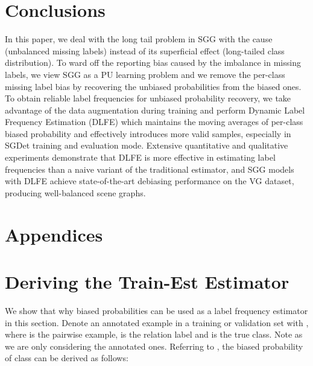 \documentclass[sigconf]{acmart}
\begin{document}
\section{Conclusions}
In this paper, we deal with the long tail problem in SGG with the cause (unbalanced missing labels) instead of its superficial effect (long-tailed class distribution).
To ward off the reporting bias caused by the imbalance in missing labels, we view SGG as a PU learning problem and we remove the per-class missing label bias by recovering the unbiased probabilities from the biased ones.
To obtain reliable label frequencies for unbiased probability recovery, we take advantage of the data augmentation during training and perform Dynamic Label Frequency Estimation (DLFE) which maintains the moving averages of per-class biased probability and effectively introduces more valid samples, especially in SGDet training and evaluation mode.
Extensive quantitative and qualitative experiments demonstrate that DLFE is more effective in estimating label frequencies than a naive variant of the traditional estimator, and SGG models with DLFE achieve state-of-the-art debiasing performance on the VG dataset, producing well-balanced scene graphs.




\balance


\newpage

\nobalance

{}
\section*{Appendices}
\setcounter{section}{0}
\renewcommand{\thesection}{\Alph{section}}
\renewcommand{\theHsection}{appendixsection.\Alph{section}}

\section{Deriving the Train-Est Estimator}
\label{sec:appendix_derive_train_est}
We show that why biased probabilities can be used as a label frequency estimator in this section. 
Denote an annotated example in a training or validation set with , where  is the pairwise example,  is the relation label and  is the true class.
Note  as we are only considering the annotated ones.
Referring to \cite{elkan2008learning}, the biased probability  of class  can be derived as follows:
\end{document}
